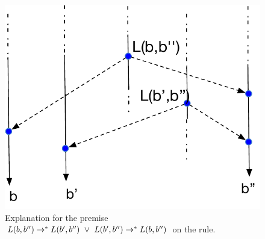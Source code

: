 \begin{figure}[ht]
  \centering
    \includegraphics[scale=0.4]{Figures/merge-precondition}
\caption{Explanation for the premise $L(b,b'') \rightarrow^{*} L(b',b'') ~\vee~ L(b',b'')
          \rightarrow^{*} L(b,b'')$ on the  rule.}
\label{fig:merge-precondition}
\end{figure}

